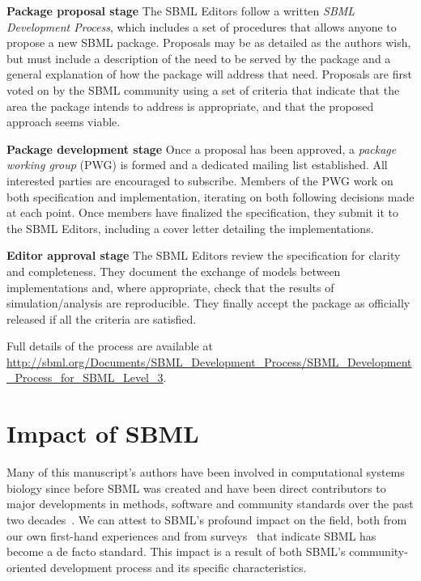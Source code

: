 \documentclass[]{draft-sbml-paper}
\begin{document}
\textbf{Package proposal stage}\newline
The SBML Editors follow a written \emph{SBML Development Process}, which includes a set of procedures that allows anyone to propose a new SBML package.  Proposals may be as detailed as the authors wish, but must include a description of the need to be served by the package and a general explanation of how the package will address that need.  Proposals are first voted on by the SBML community using a set of criteria that indicate that the area the package intends to address is appropriate, and that the proposed approach seems viable.

\textbf{Package development stage}\newline
Once a proposal has been approved, a \emph{package working group} (PWG) is formed and a dedicated mailing list established. All interested parties are encouraged to subscribe. Members of the PWG work on both specification and implementation, iterating on both following decisions made at each point. Once members have finalized the specification, they submit it to the SBML Editors, including a cover letter detailing the implementations.

\textbf{Editor approval stage}\newline
The SBML Editors review the specification for clarity and completeness. They document the exchange of models between implementations and, where appropriate, check that the results of simulation/analysis are reproducible. They finally accept the package as officially released if all the criteria are satisfied.

Full details of the process are available at \url{http://sbml.org/Documents/SBML_Development_Process/SBML_Development_Process_for_SBML_Level_3}.

\vspace{5\baselineskip}

\hrulefill
\newpage


\section*{Impact of SBML}


Many of this manuscript's authors have been involved in computational systems biology since before SBML was created and have been direct contributors to major developments in methods, software and community standards over the past two decades~\citep{Draeger2014, Hucka2015promotinga, Brazma2006standards}.  We can attest to SBML's profound impact on the field, both from our own first-hand experiences and from surveys~\citep{Cvijovic2014bridginga, Klipp2007systems} that indicate SBML has become a de facto standard.  This impact is a result of both SBML's community-oriented development process and its specific characteristics.
\end{document}
